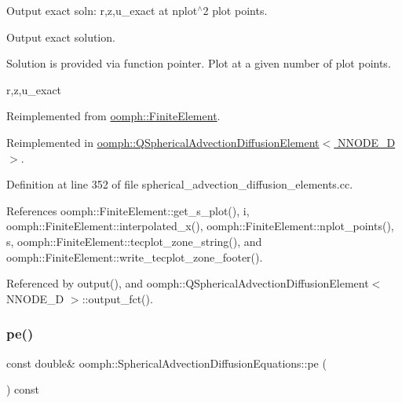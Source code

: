 Output exact soln\+: r,z,u\+\_\+exact at nplot$^\wedge$2 plot points. 

Output exact solution.

Solution is provided via function pointer. Plot at a given number of plot points.

r,z,u\+\_\+exact 

Reimplemented from \hyperlink{classoomph_1_1FiniteElement_a22b695c714f60ee6cd145be348042035}{oomph\+::\+Finite\+Element}.



Reimplemented in \hyperlink{classoomph_1_1QSphericalAdvectionDiffusionElement_ae67830606f8940978529b305794ec98d}{oomph\+::\+Q\+Spherical\+Advection\+Diffusion\+Element$<$ N\+N\+O\+D\+E\+\_\+D $>$}.



Definition at line 352 of file spherical\+\_\+advection\+\_\+diffusion\+\_\+elements.\+cc.



References oomph\+::\+Finite\+Element\+::get\+\_\+s\+\_\+plot(), i, oomph\+::\+Finite\+Element\+::interpolated\+\_\+x(), oomph\+::\+Finite\+Element\+::nplot\+\_\+points(), s, oomph\+::\+Finite\+Element\+::tecplot\+\_\+zone\+\_\+string(), and oomph\+::\+Finite\+Element\+::write\+\_\+tecplot\+\_\+zone\+\_\+footer().



Referenced by output(), and oomph\+::\+Q\+Spherical\+Advection\+Diffusion\+Element$<$ N\+N\+O\+D\+E\+\_\+D $>$\+::output\+\_\+fct().

\mbox{\label{classoomph_1_1SphericalAdvectionDiffusionEquations_a33f78b13bf746a2d0b21d3675c4c4d95}} 
\subsubsection{\texorpdfstring{pe()}{pe()}}
{\footnotesize\ttfamily const double\& oomph\+::\+Spherical\+Advection\+Diffusion\+Equations\+::pe (\begin{DoxyParamCaption}{ }\end{DoxyParamCaption}) const\hspace{0.3cm}{\ttfamily [inline]}}



